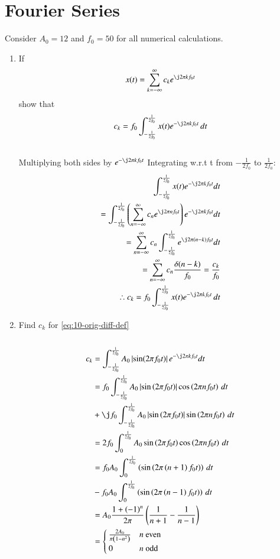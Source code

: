 \documentclass[journal,12pt,twocolumn]{IEEEtran}
\renewcommand\thesection{\arabic{section}}
\begin{document}
	\section{Fourier Series}
	Consider $A_0 =12$ and $f_0 = 50$ for all numerical calculations.
	\begin{enumerate}[label=\thesection.\arabic*,ref=\thesection.\theenumi]
		\item If
		\begin{align}
			x(t) = \sum_{k = -\infty}^{\infty}c_ke^{\j2\pi kf_0 t}
			\label{eq:one-Z-complex}
		\end{align}
		show that 
		\begin{align}
			c_k = f_0\int_{-\frac{1}{2f_0}}^{\frac{1}{2f_0}}x(t)e^{-\j2\pi kf_0 t}\, dt
			\label{eq:one-Z}
		\end{align}
		\solution\\
		Multiplying both sides by $e^{-\j2\pi kf_0 t}$ Integrating w.r.t t from $-\frac{1}{2f_0}$ to ${\frac{1}{2f_0}}$:
		\begin{align}
			\int_{-\frac{1}{2f_0}}^{\frac{1}{2f_0}}x(t)e^{-\j2\pi kf_0 t} dt\\
			= \int_{-\frac{1}{2f_0}}^{\frac{1}{2f_0}} \brak{\sum_{n = -\infty}^{\infty}c_ne^{\j2\pi nf_0 t}}e^{-\j2\pi kf_0 t} dt\\
			= \sum_{n = -\infty}^{\infty}c_n\int_{-\frac{1}{2f_0}}^{\frac{1}{2f_0}} e^{\j2\pi (n-k)f_0 t} dt\\
			=\sum_{n = -\infty}^{\infty}c_n \frac{\delta(n-k)}{f_0}
			=\frac{c_k}{f_0}\\
			\therefore c_k = f_0\int_{-\frac{1}{2f_0}}^{\frac{1}{2f_0}}x(t)e^{-\j2\pi kf_0 t}\, dt
		\end{align}
		
		
		\item Find $c_k$ for 
		\eqref{eq:10-orig-diff-def}\\
		\solution\\
		\begin{align}
			c_k &= \int_{-\frac{1}{2f_0}}^{\frac{1}{2f_0}} A_0 \abs{\sin(2\pi f_0 t)}e^{-\j2\pi kf_0 t} dt\\
			&= f_0\int_{-\frac{1}{2f_0}}^{\frac{1}{2f_0}}A_0\abs{\sin\brak{2\pi f_0t}}
			\cos\brak{2\pi nf_0t}\, dt \nonumber \\
			&+ \j f_0\int_{-\frac{1}{2f_0}}^{\frac{1}{2f_0}}A_0
			\abs{\sin\brak{2\pi f_0t}}\sin\brak{2\pi nf_0t}\, dt \\
			&= 2f_0\int_{0}^{\frac{1}{2f_0}}A_0\sin\brak{2\pi f_0t}\cos\brak{2\pi nf_0t}\, dt \\
			&= f_0A_0\int_{0}^{\frac{1}{2f_0}}\brak{\sin\brak{2\pi\brak{n+1}f_0t}}\, dt \nonumber \\ 
			&- f_0A_0\int_{0}^{\frac{1}{2f_0}}\brak{\sin\brak{2\pi\brak{n-1}f_0t}}\, dt \\ 
			&= A_0\frac{1+\brak{-1}^n}{2\pi}\brak{\frac{1}{n+1} - \frac{1}{n-1}} \\
			&= 
			\begin{cases}
				\frac{2A_0}{\pi\brak{1-n^2}} & n\ \text{even} \\
				0 & n\ \text{odd}
			\end{cases}
			\label{eq:ck-xt}
		\end{align}
		

\end{enumerate}
\end{document}
